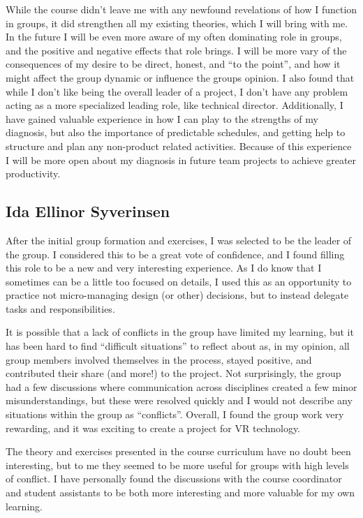While the course didn’t leave me with any newfound revelations of how I function in groups, it did strengthen all my existing theories, which I will bring with me.
In the future I will be even more aware of my often dominating role in groups, and the positive and negative effects that role brings. I will be more vary of the consequences of my desire to be direct, honest, and “to the point”, and how it might affect the group dynamic or influence the groups opinion. I also found that while I don’t like being the overall leader of a project, I don’t have any problem acting as a more specialized leading role, like technical director. Additionally, I have gained valuable experience in how I can play to the strengths of my diagnosis, but also the importance of predictable schedules, and getting help to structure and plan any non-product related activities. Because of this experience I will be more open about my diagnosis in future team projects to achieve greater productivity.

\subsection{Ida Ellinor Syverinsen}
After the initial group formation and exercises, I was selected to be the leader of the group. I considered this to be a great vote of confidence, and I found filling this role to be a new and very interesting experience. As I do know that I sometimes can be a little too focused on details, I used this as an opportunity to practice not micro-managing design (or other) decisions, but to instead delegate tasks and responsibilities. 

It is possible that a lack of conflicts in the group have limited my learning, but it has been hard to find “difficult situations” to reflect about as, in my opinion, all group members involved themselves in the process, stayed positive, and contributed their share (and more!) to the project. Not surprisingly, the group had a few discussions where communication across disciplines created a few minor misunderstandings, but these were resolved quickly and I would not describe any situations within the group as “conflicts”. Overall, I found the group work very rewarding, and it was exciting to create a project for VR technology. 

The theory and exercises presented in the course curriculum have no doubt been interesting, but to me they seemed to be more useful for groups with high levels of conflict. I have personally found the discussions with the course coordinator and student assistants to be both more interesting and more valuable for my own learning. 

